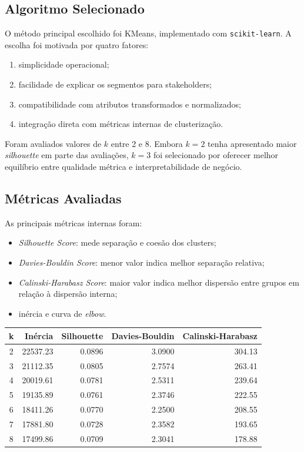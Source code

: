 \documentclass[12pt,a4paper]{article}
\begin{document}
\subsection{Algoritmo Selecionado}

O método principal escolhido foi KMeans, implementado com \texttt{scikit-learn}. A escolha foi motivada por quatro fatores:

\begin{enumerate}
  \item simplicidade operacional;
  \item facilidade de explicar os segmentos para stakeholders;
  \item compatibilidade com atributos transformados e normalizados;
  \item integração direta com métricas internas de clusterização.
\end{enumerate}

Foram avaliados valores de $k$ entre 2 e 8. Embora $k=2$ tenha apresentado maior \textit{silhouette} em parte das avaliações, $k=3$ foi selecionado por oferecer melhor equilíbrio entre qualidade métrica e interpretabilidade de negócio.

\subsection{Métricas Avaliadas}

As principais métricas internas foram:

\begin{itemize}
  \item \textit{Silhouette Score}: mede separação e coesão dos clusters;
  \item \textit{Davies-Bouldin Score}: menor valor indica melhor separação relativa;
  \item \textit{Calinski-Harabasz Score}: maior valor indica melhor dispersão entre grupos em relação à dispersão interna;
  \item inércia e curva de \textit{elbow}.
\end{itemize}

\begin{longtable}{|c|r|r|r|r|}
\hline
\textbf{k} & \textbf{Inércia} & \textbf{Silhouette} & \textbf{Davies-Bouldin} & \textbf{Calinski-Harabasz} \\
\hline
2 & 22537.23 & 0.0896 & 3.0900 & 304.13 \\
3 & 21112.35 & 0.0805 & 2.7574 & 263.41 \\
4 & 20019.61 & 0.0781 & 2.5311 & 239.64 \\
5 & 19135.89 & 0.0761 & 2.3746 & 222.55 \\
6 & 18411.26 & 0.0770 & 2.2500 & 208.55 \\
7 & 17881.80 & 0.0728 & 2.3582 & 193.65 \\
8 & 17499.86 & 0.0709 & 2.3041 & 178.88 \\
\hline
\end{longtable}
\end{document}
